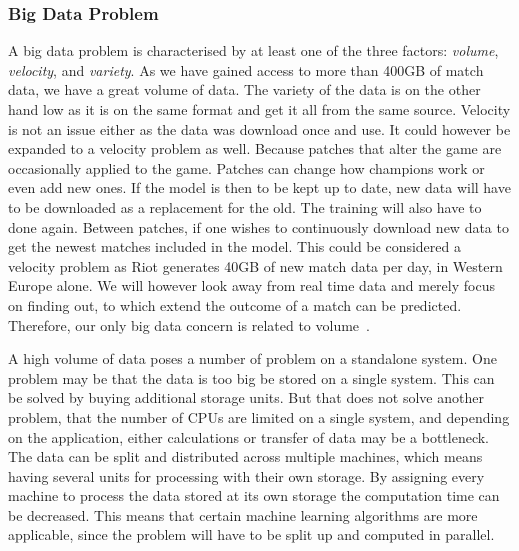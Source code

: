 \subsubsection{Big Data Problem}\label{sec:big_data_problem}
A big data problem is characterised by at least one of the three factors: \emph{volume}, \emph{velocity}, and \emph{variety}. As we have gained access to more than 400GB of match data, we have a great volume of data. The variety of the data is on the other hand low as it is on the same format and get it all from the same source. Velocity is not an issue either as the data was download once and use. It could however be expanded to a velocity problem as well. Because patches that alter the game are occasionally applied to the game. Patches can change how champions work or even add new ones. If the model is then to be kept up to date, new data will have to be downloaded as a replacement for the old. The training will also have to done again. Between patches, if one wishes to continuously download new data to get the newest matches included in the model. This could be considered a velocity problem as Riot generates 40GB of new match data per day, in Western Europe alone. We will however look away from real time data and merely focus on finding out, to which extend the outcome of a match can be predicted. Therefore, our only big data concern is related to volume~\cite{madden2012databases}.

A high volume of data poses a number of problem on a standalone system. One problem may be that the data is too big be stored on a single system.
This can be solved by buying additional storage units. But that does not solve another problem, that the number of CPUs are limited on a single system, and depending on the application, either calculations or transfer of data may be a bottleneck.
The data can be split and distributed across multiple machines, which means having several units for processing with their own storage. By assigning every machine to process the data stored at its own storage the computation time can be decreased.
This means that certain machine learning algorithms are more applicable, since the problem will have to be split up and computed in parallel. 

